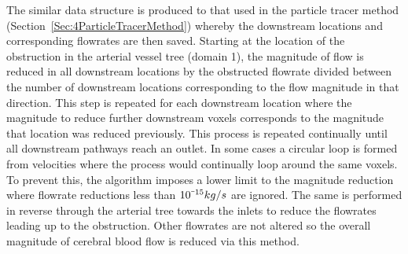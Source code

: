 \documentclass[11pt,english,a4paper,twoside,openright]{report}
\newcommand{\smallminus}{\scalebox{0.5}[1.0]{$-$}}
\begin{document}
{{{{{{{The similar data structure is produced to that used in the particle tracer method (Section~\ref{Sec:4ParticleTracerMethod}) whereby the downstream locations and corresponding flowrates are then saved. Starting at the location of the obstruction in the arterial vessel tree (domain 1), the magnitude of flow is reduced in all downstream locations by the obstructed flowrate divided between the number of downstream locations corresponding to the flow magnitude in that direction. This step is repeated for each downstream location where the magnitude to reduce further downstream voxels corresponds to the magnitude that location was reduced previously. This process is repeated continually until all downstream pathways reach an outlet. In some cases a circular loop is formed from velocities where the process would continually loop around the same voxels. To prevent this, the algorithm imposes a lower limit to the magnitude reduction where flowrate reductions less than $10^{\smallminus15}kg/s$ are ignored. The same is performed in reverse through the arterial tree towards the inlets to reduce the flowrates leading up to the obstruction. Other flowrates are not altered so the overall magnitude of cerebral blood flow is reduced via this method.

}}}}}}}
\end{document}
